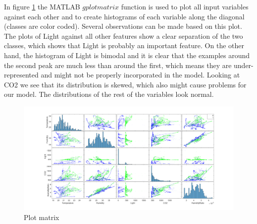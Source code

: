 \documentclass[a4paper, 11pt]{article}
\begin{document}
In figure \ref{fig:plotmatrix} the MATLAB $gplotmatrix$ function is used to plot all input variables against each other and to create histograms of each variable along the diagonal (classes are color coded). Several observations can be made based on this plot. The plots of Light against all other features show a clear separation of the two classes, which shows that Light is probably an important feature. On the other hand, the histogram of Light is bimodal and it is clear that the examples around the second peak are much less than around the first, which means they are under-represented and might not be properly incorporated in the model. Looking at CO2 we see that its distribution is skewed, which also might cause problems for our model. The distributions of the rest of the variables look normal. 

\begin{figure}[h]
  \centering
    \includegraphics[width=1\textwidth]{../figures/plotmatrix.png}
	\caption{Plot matrix}    
    \label{fig:plotmatrix}
\end{figure}
\end{document}
